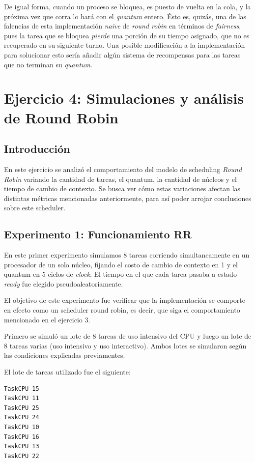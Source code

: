 \documentclass[a4paper]{article}
\begin{document}
De igual forma, cuando un proceso se bloquea, es puesto de vuelta en la
cola, y la próxima vez que corra lo hará con el \textit{quantum} entero.
Ésto es, quizás, una de las falencias de esta implementación \textit{naive}
de \textit{round robin} en términos de \textit{fairness}, pues la tarea que
se bloquea \textit{pierde} una porción de su tiempo asignado, que no es
recuperado en su siguiente turno. Una posible modificación a la
implementación para solucionar esto sería añadir algún sistema de
recompensas para las tareas que no terminan su \textit{quantum}.

\section{Ejercicio 4: Simulaciones y análisis de Round Robin}

\subsection{Introducción}
En este ejercicio se analizó el comportamiento del modelo de scheduling
\textit{Round Robin} variando la cantidad de tareas, el quantum, la cantidad
de núcleos y el tiempo de cambio de contexto. Se busca ver cómo estas
variaciones afectan las distintas métricas mencionadas anteriormente, para
así poder arrojar conclusiones sobre este scheduler.

\subsection{Experimento 1: Funcionamiento RR}
En este primer experimento simulamos 8 tareas corriendo simultaneamente en
un procesador de un solo núcleo, fijando el costo de cambio de contexto en 1
y el quantum en 5 ciclos de \textit{clock}. El tiempo en el que cada tarea
pasaba a estado \textit{ready} fue elegido pseudoaleatoriamente.

El objetivo de este experimento fue verificar que la implementación se
comporte en efecto como un scheduler round robin, es decir, que siga el
comportamiento mencionado en el ejercicio 3.

Primero se simuló un lote de 8 tareas de uso intensivo del CPU y luego un
lote de 8 tareas varias (uso intensivo y uso interactivo). Ambos lotes se
simularon según las condiciones explicadas previamentes.

El lote de tareas utilizado fue el siguiente:

\begin{verbatim}
TaskCPU 15
TaskCPU 11
TaskCPU 25
TaskCPU 24
TaskCPU 10
TaskCPU 16
TaskCPU 13
TaskCPU 22
\end{verbatim}
\end{document}

